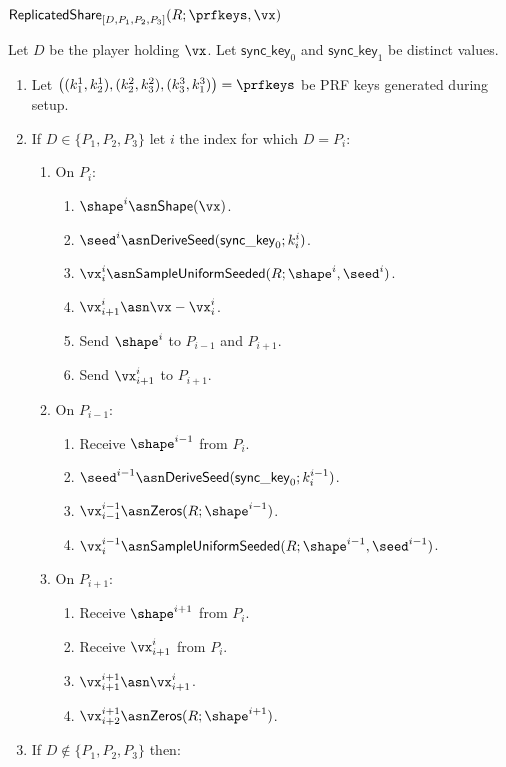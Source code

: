 
\msubsubsection
{$\mathsf{ReplicatedShare}_{[D, P_1, P_2, P_3]}(R; \prfkeys, \vx)$}

\label{fig:replicated-share}
  Let $D$ be the player holding $\vx$. Let $\mathsf{sync\_key}_0$ and $\mathsf{sync\_key}_1$ be distinct values.

  \begin{enumerate}
  \item Let $\left( (k_1^1, k_2^1), (k_2^2, k_3^2), (k_3^3, k_1^3) \right) = \prfkeys$ be PRF keys generated during setup.
  \item If $D \in \{P_1, P_2, P_3\}$ let $i$ the index for which $D = P_i$:

    \begin{enumerate}
    \item On $P_i$:
      \begin{enumerate}
        \item $\shape^i \asn \mathsf{Shape}(\vx)$.
        \item ${\seed}^i \asn \mathsf{DeriveSeed}(\mathsf{sync\_key}_0; k^i_i)$.
        \item $\vx_i^i \asn \mathsf{SampleUniformSeeded}(R; \shape^i, \seed^i)$.
        \item $\vx_{i+1}^i \asn \vx - \vx_i^i$.
        \item Send $\shape^i$ to $P_{i-1}$ and $P_{i+1}$.
        \item Send $\vx_{i+1}^i$ to $P_{i+1}$.
      \end{enumerate}

    \item On $P_{i-1}$:
      \begin{enumerate}
        \item Receive $\shape^{i-1}$ from $P_i$.
        \item ${\seed}^{i-1} \asn \mathsf{DeriveSeed}(\mathsf{sync\_key}_0; k^{i-1}_i)$.
        \item $\vx_{i-1}^{i-1} \asn \mathsf{Zeros}(R; \shape^{i-1})$.
        \item $\vx_i^{i-1} \asn \mathsf{SampleUniformSeeded}(R; \shape^{i-1}, \seed^{i-1})$.
      \end{enumerate}

    \item On $P_{i+1}$:
      \begin{enumerate}
        \item Receive $\shape^{i+1}$ from $P_i$.
        \item Receive $\vx_{i+1}^i$ from $P_i$.
        \item $\vx_{i+1}^{i+1} \asn \vx_{i+1}^i$.
        \item $\vx_{i+2}^{i+1} \asn \mathsf{Zeros}(R; \shape^{i+1})$.
      \end{enumerate}
    \end{enumerate}
  \item If $D \notin \{P_1, P_2, P_3\}$ then:


\end{enumerate}
